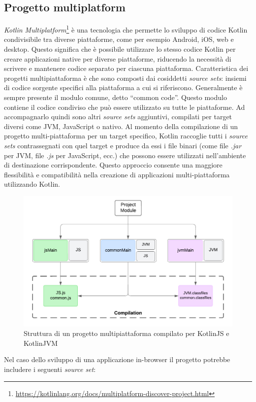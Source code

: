\subsection{Progetto multiplatform}
\textit{Kotlin Multiplatform}\footnote{\url{https://kotlinlang.org/docs/multiplatform-discover-project.html}} è una tecnologia che permette lo sviluppo di codice Kotlin condivisibile tra diverse piattaforme, come per esempio Android, iOS, web e desktop. Questo significa che è possibile utilizzare lo stesso codice Kotlin per creare applicazioni native per diverse piattaforme, riducendo la necessità di scrivere e mantenere codice separato per ciascuna piattaforma.
Caratteristica dei progetti multipiattaforma è che sono composti dai cosiddetti \textit{source sets}: insiemi di codice sorgente specifici alla piattaforma a cui si riferiscono. Generalmente è sempre presente il modulo comune, detto ``common code''. Questo modulo contiene il codice condiviso che può essere utilizzato su tutte le piattaforme. Ad accompagnarlo quindi sono altri \textit{source sets} aggiuntivi, compilati per target diversi come \ac{JVM}, JavaScript o nativo.  
Al momento della compilazione di un progetto multi-piattaforma per un target specifico, Kotlin raccoglie tutti i \textit{source sets} contrassegnati con quel target e produce da essi i file binari (come file \textit{.jar} per JVM, file \textit{.js} per JavaScript, ecc.) che possono essere utilizzati nell'ambiente di destinazione corrispondente.
Questo approccio consente una maggiore flessibilità e compatibilità nella creazione di applicazioni multi-piattaforma utilizzando Kotlin.
\begin{figure}
	\centering
	\includegraphics[width=.7\linewidth]{imgs/MPProject.pdf}
	\caption{Struttura di un progetto multipiattaforma compilato per KotlinJS e KotlinJVM}
	\label{fig:mpp-project}
\end{figure}
Nel caso dello sviluppo di una applicazione in-browser il progetto potrebbe includere i seguenti \textit{source set}:
